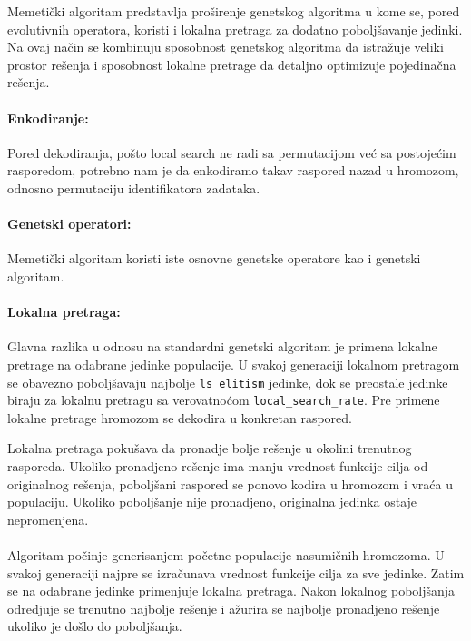 \documentclass{article}
\begin{document}
Memetički algoritam predstavlja proširenje genetskog algoritma u kome 
se, pored evolutivnih operatora, koristi i lokalna pretraga za 
dodatno poboljšavanje jedinki. Na ovaj način se kombinuju sposobnost 
genetskog algoritma da istražuje veliki prostor rešenja i 
sposobnost lokalne pretrage da detaljno optimizuje pojedinačna rešenja.


\paragraph{Enkodiranje:} Pored dekodiranja, pošto local search 
ne radi sa permutacijom već sa postojećim rasporedom, potrebno nam je da
enkodiramo takav raspored nazad u hromozom, odnosno permutaciju 
identifikatora zadataka.

\paragraph{Genetski operatori:} Memetički algoritam koristi 
iste osnovne genetske operatore kao i genetski algoritam.


\paragraph{Lokalna pretraga:} Glavna razlika u odnosu na standardni 
genetski algoritam je primena lokalne pretrage na odabrane 
jedinke populacije. U svakoj generaciji lokalnom pretragom se 
obavezno poboljšavaju najbolje \texttt{ls\_elitism} jedinke, dok se 
preostale jedinke biraju za lokalnu pretragu sa verovatnoćom 
\texttt{local\_search\_rate}. Pre primene lokalne pretrage hromozom se 
dekodira u konkretan raspored.

Lokalna pretraga pokušava da pronadje bolje rešenje u okolini 
trenutnog rasporeda. Ukoliko pronadjeno rešenje ima manju 
vrednost funkcije cilja od originalnog rešenja, poboljšani 
raspored se ponovo kodira u hromozom i vraća u populaciju. 
Ukoliko poboljšanje nije pronadjeno, originalna jedinka ostaje 
nepromenjena.

\paragraph{} Algoritam počinje generisanjem 
početne populacije nasumičnih hromozoma. U svakoj generaciji 
najpre se izračunava vrednost funkcije cilja za sve jedinke. 
Zatim se na odabrane jedinke primenjuje lokalna pretraga. 
Nakon lokalnog poboljšanja odredjuje se trenutno najbolje 
rešenje i ažurira se najbolje pronadjeno rešenje ukoliko je 
došlo do poboljšanja.
\end{document}
